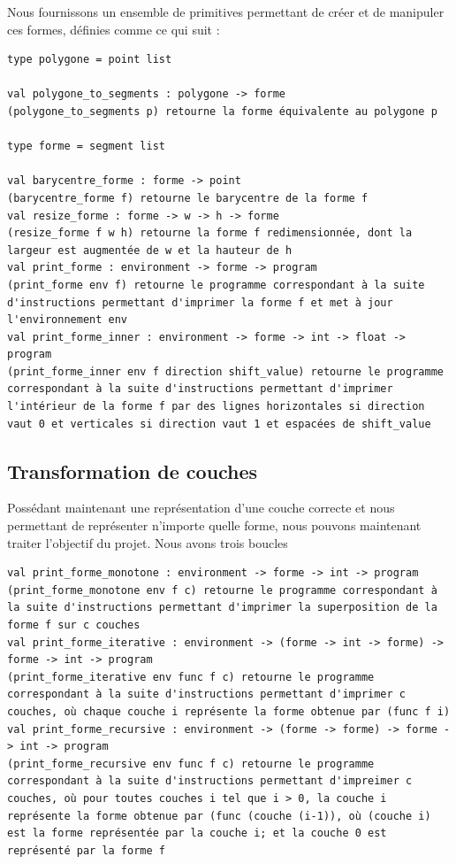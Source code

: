 \documentclass[11pt, titlepage]{article}
\begin{document}
Nous fournissons un ensemble de primitives permettant de créer et de manipuler ces formes, définies comme ce qui suit :
\begin{lstlisting}
type polygone = point list

val polygone_to_segments : polygone -> forme
(polygone_to_segments p) retourne la forme équivalente au polygone p

type forme = segment list

val barycentre_forme : forme -> point
(barycentre_forme f) retourne le barycentre de la forme f
val resize_forme : forme -> w -> h -> forme
(resize_forme f w h) retourne la forme f redimensionnée, dont la largeur est augmentée de w et la hauteur de h
val print_forme : environment -> forme -> program
(print_forme env f) retourne le programme correspondant à la suite d'instructions permettant d'imprimer la forme f et met à jour l'environnement env
val print_forme_inner : environment -> forme -> int -> float -> program
(print_forme_inner env f direction shift_value) retourne le programme correspondant à la suite d'instructions permettant d'imprimer l'intérieur de la forme f par des lignes horizontales si direction vaut 0 et verticales si direction vaut 1 et espacées de shift_value
\end{lstlisting}

\subsection{Transformation de couches}
Possédant maintenant une représentation d'une couche correcte et nous permettant de représenter n'importe quelle forme, nous pouvons maintenant traiter l'objectif du projet.
Nous avons trois boucles

\begin{lstlisting}
val print_forme_monotone : environment -> forme -> int -> program
(print_forme_monotone env f c) retourne le programme correspondant à la suite d'instructions permettant d'imprimer la superposition de la forme f sur c couches
val print_forme_iterative : environment -> (forme -> int -> forme) -> forme -> int -> program
(print_forme_iterative env func f c) retourne le programme correspondant à la suite d'instructions permettant d'imprimer c couches, où chaque couche i représente la forme obtenue par (func f i)
val print_forme_recursive : environment -> (forme -> forme) -> forme -> int -> program
(print_forme_recursive env func f c) retourne le programme correspondant à la suite d'instructions permettant d'impreimer c couches, où pour toutes couches i tel que i > 0, la couche i représente la forme obtenue par (func (couche (i-1)), où (couche i) est la forme représentée par la couche i; et la couche 0 est représenté par la forme f
\end{lstlisting}
\newpage
\end{document}
